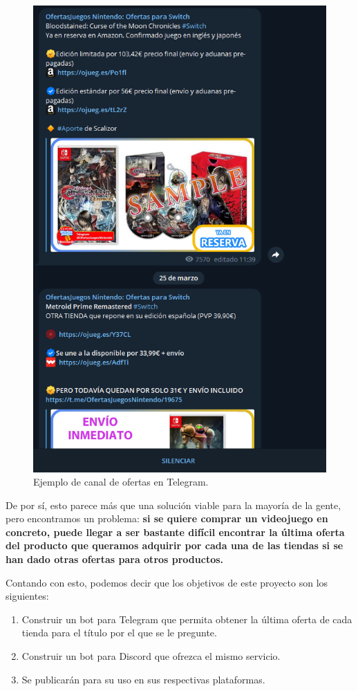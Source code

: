 \begin{figure}[H]
    \centering
    \includegraphics[scale=0.57]{figuras/canal_telegram_ofertas}
    \caption{Ejemplo de canal de ofertas en Telegram.}
    \label{fig:canal_telegram_ofertas}
\end{figure}

De por sí, esto parece más que una solución viable para la mayoría de la gente, pero encontramos un problema: \textbf{si se quiere comprar un videojuego 
en concreto, puede llegar a ser bastante difícil encontrar la última oferta del producto que queramos adquirir por cada una de las tiendas si se han dado 
otras ofertas para otros productos.}

Contando con esto, podemos decir que los objetivos de este proyecto son los siguientes:

\begin{enumerate}
    \item{Construir un bot para Telegram que permita obtener la última oferta de cada tienda para el título por el que se le pregunte.}
    \item{Construir un bot para Discord que ofrezca el mismo servicio.}
    \item{Se publicarán para su uso en sus respectivas plataformas.}
\end{enumerate}
